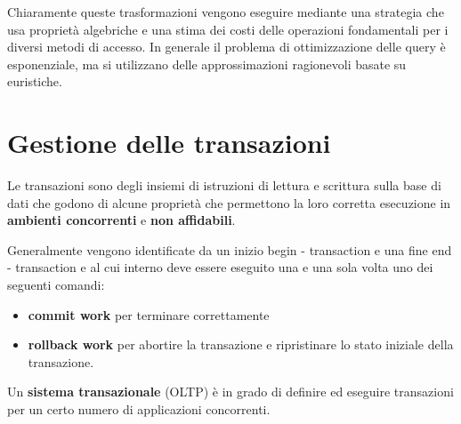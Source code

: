 Chiaramente queste trasformazioni vengono eseguire mediante una strategia che
usa proprietà algebriche e una stima dei costi delle operazioni fondamentali per
i diversi metodi di accesso. In generale il problema di ottimizzazione delle
query è esponenziale, ma si utilizzano delle approssimazioni ragionevoli basate
su euristiche.
\section{Gestione delle transazioni}
Le transazioni sono degli insiemi di istruzioni di lettura e scrittura sulla base
di dati che godono di alcune proprietà che permettono la loro corretta esecuzione
in \textbf{ambienti concorrenti} e \textbf{non affidabili}.

Generalmente vengono identificate da un inizio begin - transaction e una fine
end - transaction e al cui interno deve essere eseguito una e una sola
volta uno dei seguenti comandi:
\begin{itemize}
      \item \textbf{commit work} per terminare correttamente
      \item \textbf{rollback work} per abortire la transazione e ripristinare lo
            stato iniziale della transazione.
\end{itemize}
Un \textbf{sistema transazionale} (OLTP) è in grado di definire ed eseguire
transazioni per un certo numero di applicazioni concorrenti.

